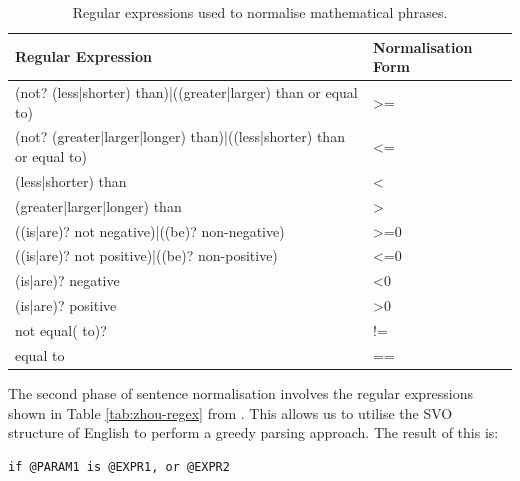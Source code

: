\begin{table}[h]
	\begin{tabular}{|l|l|}
		\hline
		\textbf{Regular Expression} & \textbf{Normalisation Form} \\ \hline
		(not? (less|shorter) than)|((greater|larger) than or equal to) & \textgreater{}= \\ \hline
		(not? (greater|larger|longer) than)|((less|shorter) than or equal to) & \textless{}= \\ \hline
		(less|shorter) than & \textless{} \\ \hline
		(greater|larger|longer) than & \textgreater{} \\ \hline
		((is|are)? not negative)|((be)? non-negative) & \textgreater{}=0 \\ \hline
		((is|are)? not positive)|((be)? non-positive) & \textless{}=0 \\ \hline
		(is|are)? negative & \textless{}0 \\ \hline
		(is|are)? positive & \textgreater{}0 \\ \hline
		not equal( to)? & != \\ \hline
		equal to & == \\ \hline
	\end{tabular}
	\caption{Regular expressions used to normalise mathematical phrases.}
	\label{tab:normalisation-regex}
\end{table}

The second phase of sentence normalisation involves the regular expressions shown in Table \ref{tab:zhou-regex} from \cite{zhou-directive}. This allows us to utilise the SVO structure of English to perform a greedy parsing approach. The result of this is:

\begin{verbatim}
if @PARAM1 is @EXPR1, or @EXPR2
\end{verbatim}

